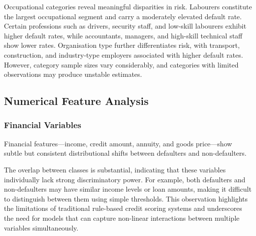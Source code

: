 

Occupational categories reveal meaningful disparities in risk. Labourers constitute the largest occupational segment and carry a moderately elevated default rate. Certain professions such as drivers, security staff, and low-skill labourers exhibit higher default rates, while accountants, managers, and high-skill technical staff show lower rates. Organisation type further differentiates risk, with transport, construction, and industry-type employers associated with higher default rates. However, category sample sizes vary considerably, and categories with limited observations may produce unstable estimates.

\subsection{Numerical Feature Analysis}
\label{subsec:numerical_eda}

\subsubsection{Financial Variables}

Financial features---income, credit amount, annuity, and goods price---show subtle but consistent distributional shifts between defaulters and non-defaulters.



The overlap between classes is substantial, indicating that these variables individually lack strong discriminatory power. For example, both defaulters and non-defaulters may have similar income levels or loan amounts, making it difficult to distinguish between them using simple thresholds. This observation highlights the limitations of traditional rule-based credit scoring systems and underscores the need for models that can capture non-linear interactions between multiple variables simultaneously.

